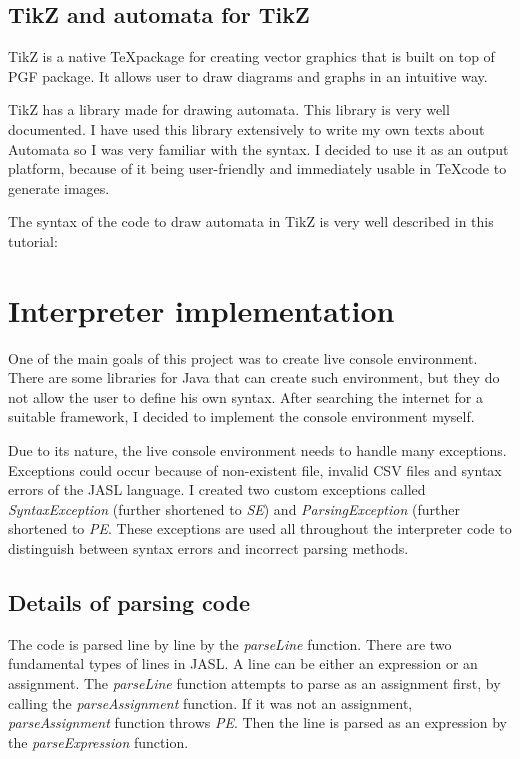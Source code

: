 \documentclass{ctuthesis}
\begin{document}
\subsection{TikZ and automata for TikZ}
TikZ is a native \TeX package for creating vector graphics that is built on top of PGF package. It allows user to draw diagrams and graphs in an intuitive way.

TikZ has a library made for drawing automata. This library is very well documented. I have used this library extensively to write my own texts about Automata so I was very familiar with the syntax. I decided to use it as an output platform, because of it being user-friendly and immediately usable in \TeX code to generate images.

The syntax of the code to draw automata in TikZ is very well described in this tutorial:~\cite{tikz-tut}

\section{Interpreter implementation}
One of the main goals of this project was to create live console environment. There are some libraries for Java that can create such environment, but they do not allow the user to define his own syntax. After searching the internet for a suitable framework, I decided to implement the console environment myself. 

Due to its nature, the live console environment needs to handle many exceptions. Exceptions could occur because of non-existent file, invalid CSV files and syntax errors of the JASL language. I created two custom exceptions called \textit{SyntaxException} (further shortened to \textit{SE}) and \textit{ParsingException} (further shortened to \textit{PE}. These exceptions are used all throughout the interpreter code to distinguish between syntax errors and incorrect parsing methods.

\subsection{Details of parsing code}
The code is parsed line by line by the \textit{parseLine} function. There are two fundamental types of lines in JASL. A line can be either an expression or an assignment. The \textit{parseLine} function attempts to parse as an assignment first, by calling the \textit{parseAssignment} function. If it was not an assignment, \textit{parseAssignment} function throws \textit{PE}. Then the line is parsed as an expression by the \textit{parseExpression} function.
\end{document}
